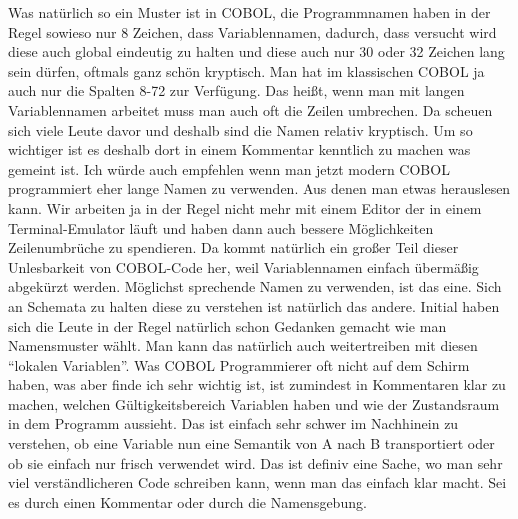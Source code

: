 {Was natürlich so ein Muster ist in COBOL, die Programmnamen haben in der Regel sowieso nur 8 Zeichen, dass Variablennamen, dadurch, dass versucht wird diese auch global eindeutig zu halten und diese auch nur 30 oder 32 Zeichen lang sein dürfen, oftmals ganz schön kryptisch. Man hat im klassischen COBOL ja auch nur die Spalten 8-72 zur Verfügung. Das heißt, wenn man mit langen Variablennamen arbeitet muss man auch oft die Zeilen umbrechen. Da scheuen sich viele Leute davor und deshalb sind die Namen relativ kryptisch. Um so wichtiger ist es deshalb dort in einem Kommentar kenntlich zu machen was gemeint ist. Ich würde auch empfehlen wenn man jetzt modern COBOL programmiert eher lange Namen zu verwenden. Aus denen man etwas herauslesen kann. Wir arbeiten ja in der Regel nicht mehr mit einem Editor der in einem Terminal-Emulator läuft und haben dann auch bessere Möglichkeiten Zeilenumbrüche zu spendieren. Da kommt natürlich ein großer Teil dieser Unlesbarkeit von COBOL-Code her, weil Variablennamen einfach übermäßig abgekürzt werden. Möglichst sprechende Namen zu verwenden, ist das eine. Sich an Schemata zu halten \bzw diese zu verstehen ist natürlich das andere. Initial haben sich die Leute in der Regel natürlich schon Gedanken gemacht wie man Namensmuster wählt. Man kann das natürlich auch weitertreiben mit diesen ``lokalen Variablen''. Was COBOL Programmierer oft nicht auf dem Schirm haben, was aber finde ich sehr wichtig ist, ist zumindest in Kommentaren klar zu machen, welchen Gültigkeitsbereich Variablen haben und wie der Zustandsraum in dem Programm aussieht. Das ist einfach sehr schwer im Nachhinein zu verstehen, ob eine Variable nun eine Semantik von A nach B transportiert oder ob sie einfach nur frisch verwendet wird. Das ist definiv eine Sache, wo man sehr viel verständlicheren Code schreiben kann, wenn man das einfach klar macht. Sei es durch einen Kommentar oder durch die Namensgebung.

}
